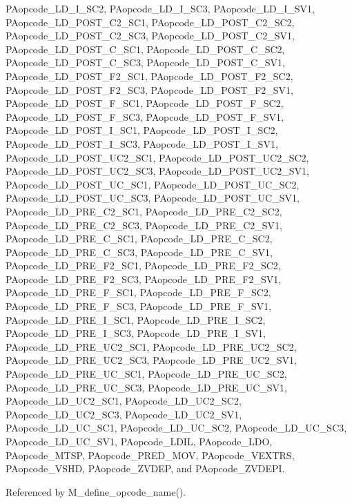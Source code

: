 PAopcode\_\-LD\_\-I\_\-SC2, PAopcode\_\-LD\_\-I\_\-SC3, PAopcode\_\-LD\_\-I\_\-SV1, PAopcode\_\-LD\_\-POST\_\-C2\_\-SC1, PAopcode\_\-LD\_\-POST\_\-C2\_\-SC2, PAopcode\_\-LD\_\-POST\_\-C2\_\-SC3, PAopcode\_\-LD\_\-POST\_\-C2\_\-SV1, PAopcode\_\-LD\_\-POST\_\-C\_\-SC1, PAopcode\_\-LD\_\-POST\_\-C\_\-SC2, PAopcode\_\-LD\_\-POST\_\-C\_\-SC3, PAopcode\_\-LD\_\-POST\_\-C\_\-SV1, PAopcode\_\-LD\_\-POST\_\-F2\_\-SC1, PAopcode\_\-LD\_\-POST\_\-F2\_\-SC2, PAopcode\_\-LD\_\-POST\_\-F2\_\-SC3, PAopcode\_\-LD\_\-POST\_\-F2\_\-SV1, PAopcode\_\-LD\_\-POST\_\-F\_\-SC1, PAopcode\_\-LD\_\-POST\_\-F\_\-SC2, PAopcode\_\-LD\_\-POST\_\-F\_\-SC3, PAopcode\_\-LD\_\-POST\_\-F\_\-SV1, PAopcode\_\-LD\_\-POST\_\-I\_\-SC1, PAopcode\_\-LD\_\-POST\_\-I\_\-SC2, PAopcode\_\-LD\_\-POST\_\-I\_\-SC3, PAopcode\_\-LD\_\-POST\_\-I\_\-SV1, PAopcode\_\-LD\_\-POST\_\-UC2\_\-SC1, PAopcode\_\-LD\_\-POST\_\-UC2\_\-SC2, PAopcode\_\-LD\_\-POST\_\-UC2\_\-SC3, PAopcode\_\-LD\_\-POST\_\-UC2\_\-SV1, PAopcode\_\-LD\_\-POST\_\-UC\_\-SC1, PAopcode\_\-LD\_\-POST\_\-UC\_\-SC2, PAopcode\_\-LD\_\-POST\_\-UC\_\-SC3, PAopcode\_\-LD\_\-POST\_\-UC\_\-SV1, PAopcode\_\-LD\_\-PRE\_\-C2\_\-SC1, PAopcode\_\-LD\_\-PRE\_\-C2\_\-SC2, PAopcode\_\-LD\_\-PRE\_\-C2\_\-SC3, PAopcode\_\-LD\_\-PRE\_\-C2\_\-SV1, PAopcode\_\-LD\_\-PRE\_\-C\_\-SC1, PAopcode\_\-LD\_\-PRE\_\-C\_\-SC2, PAopcode\_\-LD\_\-PRE\_\-C\_\-SC3, PAopcode\_\-LD\_\-PRE\_\-C\_\-SV1, PAopcode\_\-LD\_\-PRE\_\-F2\_\-SC1, PAopcode\_\-LD\_\-PRE\_\-F2\_\-SC2, PAopcode\_\-LD\_\-PRE\_\-F2\_\-SC3, PAopcode\_\-LD\_\-PRE\_\-F2\_\-SV1, PAopcode\_\-LD\_\-PRE\_\-F\_\-SC1, PAopcode\_\-LD\_\-PRE\_\-F\_\-SC2, PAopcode\_\-LD\_\-PRE\_\-F\_\-SC3, PAopcode\_\-LD\_\-PRE\_\-F\_\-SV1, PAopcode\_\-LD\_\-PRE\_\-I\_\-SC1, PAopcode\_\-LD\_\-PRE\_\-I\_\-SC2, PAopcode\_\-LD\_\-PRE\_\-I\_\-SC3, PAopcode\_\-LD\_\-PRE\_\-I\_\-SV1, PAopcode\_\-LD\_\-PRE\_\-UC2\_\-SC1, PAopcode\_\-LD\_\-PRE\_\-UC2\_\-SC2, PAopcode\_\-LD\_\-PRE\_\-UC2\_\-SC3, PAopcode\_\-LD\_\-PRE\_\-UC2\_\-SV1, PAopcode\_\-LD\_\-PRE\_\-UC\_\-SC1, PAopcode\_\-LD\_\-PRE\_\-UC\_\-SC2, PAopcode\_\-LD\_\-PRE\_\-UC\_\-SC3, PAopcode\_\-LD\_\-PRE\_\-UC\_\-SV1, PAopcode\_\-LD\_\-UC2\_\-SC1, PAopcode\_\-LD\_\-UC2\_\-SC2, PAopcode\_\-LD\_\-UC2\_\-SC3, PAopcode\_\-LD\_\-UC2\_\-SV1, PAopcode\_\-LD\_\-UC\_\-SC1, PAopcode\_\-LD\_\-UC\_\-SC2, PAopcode\_\-LD\_\-UC\_\-SC3, PAopcode\_\-LD\_\-UC\_\-SV1, PAopcode\_\-LDIL, PAopcode\_\-LDO, PAopcode\_\-MTSP, PAopcode\_\-PRED\_\-MOV, PAopcode\_\-VEXTRS, PAopcode\_\-VSHD, PAopcode\_\-ZVDEP, and PAopcode\_\-ZVDEPI.

Referenced by M\_\-define\_\-opcode\_\-name().

